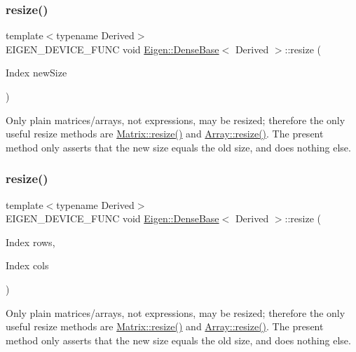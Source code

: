 \subsubsection{\texorpdfstring{resize()}{resize()}\hspace{0.1cm}{\footnotesize\ttfamily [1/2]}}
{\footnotesize\ttfamily template$<$typename Derived$>$ \\
E\+I\+G\+E\+N\+\_\+\+D\+E\+V\+I\+C\+E\+\_\+\+F\+U\+NC void \mbox{\hyperlink{class_eigen_1_1_dense_base}{Eigen\+::\+Dense\+Base}}$<$ Derived $>$\+::resize (\begin{DoxyParamCaption}\item[{Index}]{new\+Size }\end{DoxyParamCaption})\hspace{0.3cm}{\ttfamily [inline]}}

Only plain matrices/arrays, not expressions, may be resized; therefore the only useful resize methods are \mbox{\hyperlink{class_eigen_1_1_plain_object_base_a99d9054ee2d5a40c6e00ded0265e9cea}{Matrix\+::resize()}} and \mbox{\hyperlink{class_eigen_1_1_plain_object_base_a99d9054ee2d5a40c6e00ded0265e9cea}{Array\+::resize()}}. The present method only asserts that the new size equals the old size, and does nothing else. \mbox{\label{class_eigen_1_1_dense_base_aef40c2ee48a85a799270c8258cc12b76}} 
\subsubsection{\texorpdfstring{resize()}{resize()}\hspace{0.1cm}{\footnotesize\ttfamily [2/2]}}
{\footnotesize\ttfamily template$<$typename Derived$>$ \\
E\+I\+G\+E\+N\+\_\+\+D\+E\+V\+I\+C\+E\+\_\+\+F\+U\+NC void \mbox{\hyperlink{class_eigen_1_1_dense_base}{Eigen\+::\+Dense\+Base}}$<$ Derived $>$\+::resize (\begin{DoxyParamCaption}\item[{Index}]{rows,  }\item[{Index}]{cols }\end{DoxyParamCaption})\hspace{0.3cm}{\ttfamily [inline]}}

Only plain matrices/arrays, not expressions, may be resized; therefore the only useful resize methods are \mbox{\hyperlink{class_eigen_1_1_plain_object_base_a99d9054ee2d5a40c6e00ded0265e9cea}{Matrix\+::resize()}} and \mbox{\hyperlink{class_eigen_1_1_plain_object_base_a99d9054ee2d5a40c6e00ded0265e9cea}{Array\+::resize()}}. The present method only asserts that the new size equals the old size, and does nothing else. \mbox{\label{class_eigen_1_1_dense_base_a38ea394036d8b096abf322469c80198f}} 
